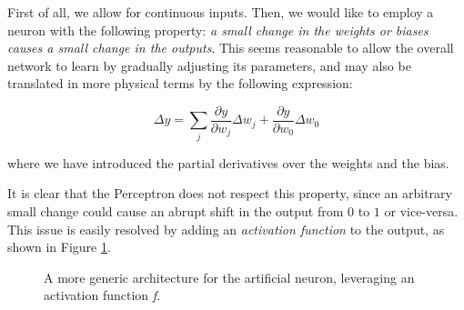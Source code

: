 First of all, we allow for continuous inputs. Then, we would like to employ a neuron with the following property: \emph{a small change in the \emph{weights} or \emph{biases} causes a small change in the \emph{outputs}}. This seems reasonable to allow the overall network to learn by gradually adjusting its parameters, and may also be translated in more physical terms by the following expression:

\begin{equation}\label{eqn:yderiv}
  \Delta y = \sum_j \frac{\partial y}{\partial w_j}\Delta w_j + \frac{\partial y}{\partial w_0}\Delta w_0
\end{equation}



where we have introduced the partial derivatives over the weights and the bias.

It is clear that the Perceptron does not respect this property, since an arbitrary small change could cause an abrupt shift in the output from $0$ to $1$ or vice-versa. This issue is easily resolved by adding an \emph{activation function} to the output, as shown in Figure \ref{fig:artneur}.

\begin{figure}
    \centering
    
    
    \caption[Generic artificial neuron]{A more generic architecture for the artificial neuron, leveraging an activation function \emph{f}.}
    \label{fig:artneur}
\end{figure}

